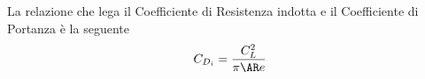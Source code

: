 \newpage

La relazione che lega il Coefficiente di Resistenza indotta e il Coefficiente di Portanza  è la seguente \\

\begin{equation}
\label{eqn:cdi}
C_{D_ i}=\frac {C_L^2}{{\pi}{\AR}e}
\end{equation}

